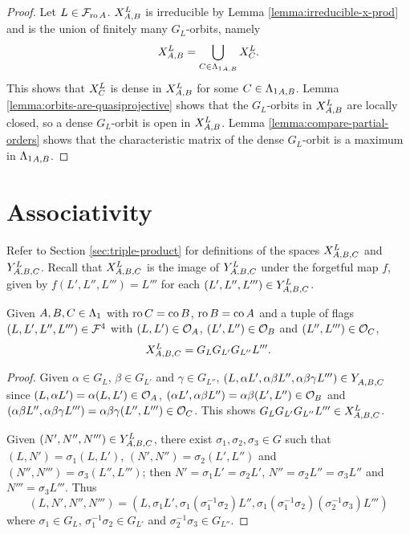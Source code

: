 \documentclass[a4paper, 11pt]{report}
\begin{document}
\begin{proof}
Let $L\in\flags_{\ro{A}}$. $\xprod[L]{A,B}$ is irreducible by Lemma \ref{lemma:irreducible-x-prod} and is the union of finitely many $G_L$-orbits, namely
\begin{equation*}
\xprod[L]{A,B} = \bigcup_{C\in\matrices_{A,B}} \xprod[L]{C}.
\end{equation*}
This shows that $\xprod[L]{C}$ is dense in $\xprod[L]{A,B}$ for some $C\in\matrices_{A,B}$. Lemma \ref{lemma:orbits-are-quasiprojective} shows that the $G_L$-orbits in $\xprod[L]{A,B}$ are locally closed, so a dense $G_L$-orbit is open in $\xprod[L]{A,B}$. Lemma \ref{lemma:compare-partial-orders} shows that the characteristic matrix of the dense $G_L$-orbit is a maximum in $\matrices_{A,B}$.
\end{proof}

\section{Associativity}

Refer to Section \ref{sec:triple-product} for definitions of the spaces $\xprod[L]{A,B,C}$ and $\yprod[L]{A,B,C}$. Recall that $\xprod[L]{A,B,C}$ is the image of $\yprod[L]{A,B,C}$ under the forgetful map $f$, given by $f(L',L'',L''') = L'''$ for each $(L',L'',L''')\in\yprod[L]{A,B,C}$.

\begin{lemma}
Given $A,B,C\in\matrices$ with $\ro{C}=\co{B}$, $\ro{B}=\co{A}$ and a tuple of flags $(L,L',L'',L''')\in\flags^4$ with $(L,L')\in\orbit{A}$, $(L',L'')\in\orbit{B}$ and $(L'',L''')\in\orbit{C}$,
\begin{equation*}
\xprod[L]{A,B,C} = G_L G_{L'} G_{L''} L'''.
\end{equation*}
\end{lemma}

\begin{proof}
Given $\alpha\in G_L$, $\beta\in G_{L'}$ and $\gamma\in G_{L''}$, $(L,\alpha L',\alpha\beta L'',\alpha\beta\gamma L''')\in\yprod{A,B,C}$ since $(L,\alpha L')=\alpha(L,L')\in\orbit{A}$, $(\alpha L',\alpha\beta L'')=\alpha\beta(L',L'')\in\orbit{B}$ and $(\alpha\beta L'',\alpha\beta\gamma L''')=\alpha\beta\gamma(L'',L''')\in\orbit{C}$. This shows $G_L G_{L'} G_{L''}L'''\in\xprod[L]{A,B,C}$.

Given $(N',N'',N''')\in\yprod[L]{A,B,C}$, there exist $\sigma_1,\sigma_2,\sigma_3\in G$ such that $(L,N') = \sigma_1(L,L')$, $(N',N'') = \sigma_2(L',L'')$ and $(N'',N''') = \sigma_3(L'',L''')$; then $N' = \sigma_1 L' = \sigma_2 L'$, $N'' = \sigma_2 L'' = \sigma_3 L''$ and $N''' = \sigma_3 L'''$. Thus
\begin{equation*}
(L,N',N'',N''') = (L,\sigma_1 L', \sigma_1(\sigma_1^{-1}\sigma_2)L'', \sigma_1(\sigma_1^{-1}\sigma_2)(\sigma_2^{-1}\sigma_3)L''')
\end{equation*}
where $\sigma_1\in G_L$, $\sigma_1^{-1}\sigma_2\in G_{L'}$ and $\sigma_2^{-1}\sigma_3\in G_{L''}$.
\end{proof}
\end{document}

